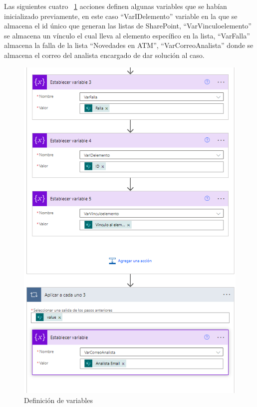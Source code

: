 Las siguientes cuatro ~\ref{fig:defvar2} acciones definen algunas variables que se habían inicializado previamente, en este caso ``VarIDelemento'' variable en la que se almacena el id único que generan las listas de SharePoint, ``VarVinculoelemento'' se almacena un vínculo el cual lleva al elemento específico en la lista, ``VarFalla'' almacena la falla de la lista ``Novedades en ATM'', ``VarCorreoAnalista'' donde se almacena el correo del analista encargado de dar solución al caso.

\begin{figure}[H]
	\centering
	\includegraphics[scale=0.5]{Capitulo3/imagenes/flujo14.png}
	\caption{Definición de variables}
	\label{fig:defvar2}
\end{figure}

